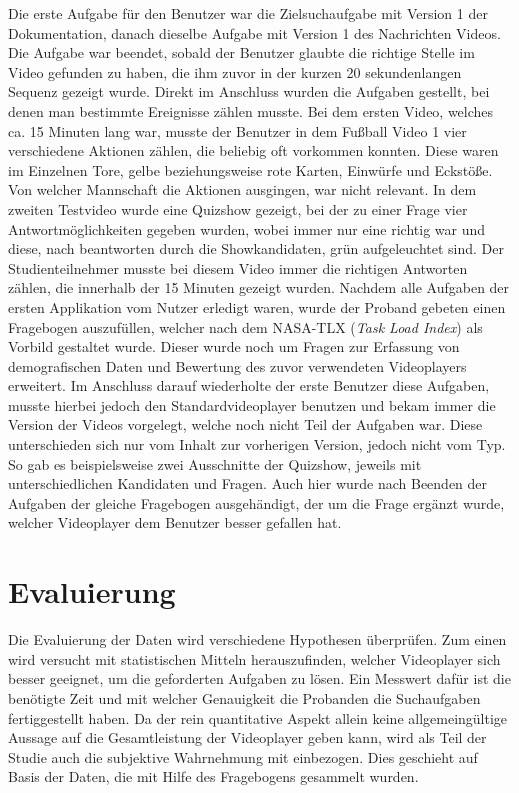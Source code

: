 \documentclass[11pt,a4paper]{report}
\begin{document}
Die erste Aufgabe für den Benutzer war die Zielsuchaufgabe mit Version 1 der Dokumentation, danach dieselbe Aufgabe mit Version 1 des Nachrichten Videos. Die Aufgabe war beendet, sobald der Benutzer glaubte die richtige Stelle im Video gefunden zu haben, die ihm zuvor in der kurzen 20 sekundenlangen Sequenz gezeigt wurde. Direkt im Anschluss wurden die Aufgaben gestellt, bei denen man bestimmte Ereignisse zählen musste. Bei dem ersten Video, welches ca. 15 Minuten lang war, musste der Benutzer in dem Fußball Video 1 vier verschiedene Aktionen zählen, die beliebig oft vorkommen konnten. Diese waren im Einzelnen Tore, gelbe beziehungsweise rote Karten, Einwürfe und Eckstöße. Von welcher Mannschaft die Aktionen ausgingen, war nicht relevant. In dem zweiten Testvideo wurde eine Quizshow gezeigt, bei der zu einer Frage vier Antwortmöglichkeiten gegeben wurden, wobei immer nur eine richtig war und diese, nach beantworten durch die Showkandidaten, grün aufgeleuchtet sind. Der Studienteilnehmer musste bei diesem Video immer die richtigen Antworten zählen, die innerhalb der 15 Minuten gezeigt wurden. Nachdem alle Aufgaben der ersten Applikation vom Nutzer erledigt waren, wurde der Proband gebeten einen Fragebogen auszufüllen, welcher nach dem NASA-TLX (\textit{Task Load Index}) \cite{hart1988development} als Vorbild gestaltet wurde. Dieser wurde noch um Fragen zur Erfassung von demografischen Daten und Bewertung des zuvor verwendeten Videoplayers erweitert. Im Anschluss darauf wiederholte der erste Benutzer diese Aufgaben, musste hierbei jedoch den Standardvideoplayer benutzen und bekam immer die Version der Videos vorgelegt, welche noch nicht Teil der Aufgaben war. Diese unterschieden sich nur vom Inhalt zur vorherigen Version, jedoch nicht vom Typ. So gab es beispielsweise zwei Ausschnitte der Quizshow, jeweils mit unterschiedlichen Kandidaten und Fragen. Auch hier wurde nach Beenden der Aufgaben der gleiche Fragebogen ausgehändigt, der um die Frage ergänzt wurde, welcher Videoplayer dem Benutzer besser gefallen hat.

\section{Evaluierung}
Die Evaluierung der Daten wird verschiedene Hypothesen überprüfen. Zum einen wird versucht mit statistischen Mitteln herauszufinden, welcher Videoplayer sich besser geeignet, um die geforderten Aufgaben zu lösen. Ein Messwert dafür ist die benötigte Zeit und mit welcher Genauigkeit die Probanden die Suchaufgaben fertiggestellt haben. Da der rein quantitative Aspekt allein keine allgemeingültige Aussage auf die Gesamtleistung der Videoplayer geben kann, wird als Teil der Studie auch die subjektive Wahrnehmung mit einbezogen. Dies geschieht auf Basis der Daten, die mit Hilfe des Fragebogens gesammelt wurden.
\end{document}
